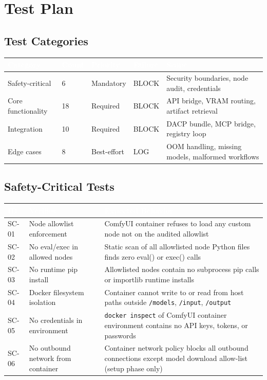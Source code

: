 \documentclass[11pt,letterpaper]{article}
\newcommand{\tableheader}[1]{\textbf{\sffamily\textcolor{white}{#1}}}
\begin{document}
\section{Test Plan}

\subsection{Test Categories}

\begin{center}
\begin{tabularx}{\textwidth}{L{3cm}C{1.5cm}L{2cm}L{2cm}X}
\toprule
{}
\tableheader{Category} & \tableheader{Count} & \tableheader{Priority} & \tableheader{Failure} & \tableheader{Scope} \\
\midrule
Safety-critical & 6 & Mandatory & BLOCK & Security boundaries, node audit, credentials \\
Core functionality & 18 & Required & BLOCK & API bridge, VRAM routing, artifact retrieval \\
Integration & 10 & Required & BLOCK & DACP bundle, MCP bridge, registry loop \\
Edge cases & 8 & Best-effort & LOG & OOM handling, missing models, malformed workflows \\
\bottomrule
\end{tabularx}
\end{center}

\subsection{Safety-Critical Tests}

\begin{center}
\begin{tabularx}{\textwidth}{C{1.5cm}L{3.5cm}X}
\toprule
{}
\tableheader{ID} & \tableheader{Verifies} & \tableheader{Expected Behavior} \\
\midrule
SC-01 & Node allowlist enforcement & ComfyUI container refuses to load any custom node not on the audited allowlist \\
SC-02 & No eval/exec in allowed nodes & Static scan of all allowlisted node Python files finds zero eval() or exec() calls \\
SC-03 & No runtime pip install & Allowlisted nodes contain no subprocess pip calls or importlib runtime installs \\
SC-04 & Docker filesystem isolation & Container cannot write to or read from host paths outside \texttt{/models}, \texttt{/input}, \texttt{/output} \\
SC-05 & No credentials in environment & \texttt{docker inspect} of ComfyUI container environment contains no API keys, tokens, or passwords \\
SC-06 & No outbound network from container & Container network policy blocks all outbound connections except model download allow-list (setup phase only) \\
\bottomrule
\end{tabularx}
\end{center}
\end{document}
